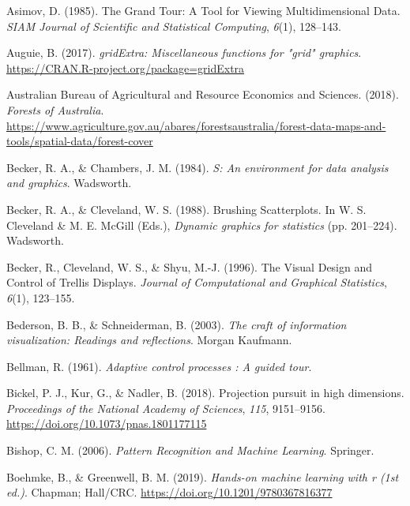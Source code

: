 \documentclass[
  letterpaper,
]{krantz}
\newlength{\cslhangindent}
\newlength{\cslentryspacingunit} %
\newenvironment{CSLReferences}[2] %
 {%
  \setlength{\parindent}{0pt}
  \ifodd #1
  \let\oldpar\par
  \def\par{\hangindent=\cslhangindent\oldpar}
  \fi
  \setlength{\parskip}{#2\cslentryspacingunit}
 }%
 {}
\begin{document}
\begin{CSLReferences}{1}{0}
\leavevmode{}%
Asimov, D. (1985). {T}he {G}rand {T}our: {A} {T}ool for {V}iewing
{M}ultidimensional {D}ata. \emph{SIAM Journal of Scientific and
Statistical Computing}, \emph{6}(1), 128--143.

\leavevmode{}%
Auguie, B. (2017). \emph{gridExtra: Miscellaneous functions for "grid"
graphics}. \url{https://CRAN.R-project.org/package=gridExtra}

\leavevmode{}%
Australian Bureau of Agricultural and Resource Economics and Sciences.
(2018). \emph{{Forests of Australia}}.
\url{https://www.agriculture.gov.au/abares/forestsaustralia/forest-data-maps-and-tools/spatial-data/forest-cover}

\leavevmode{}%
Becker, R. A., \& Chambers, J. M. (1984). \emph{{S}: An environment for
data analysis and graphics}. Wadsworth.

\leavevmode{}%
Becker, R. A., \& Cleveland, W. S. (1988). {B}rushing {S}catterplots. In
W. S. Cleveland \& M. E. McGill (Eds.), \emph{Dynamic graphics for
statistics} (pp. 201--224). Wadsworth.

\leavevmode{}%
Becker, R., Cleveland, W. S., \& Shyu, M.-J. (1996). {T}he {V}isual
{D}esign and {C}ontrol of {T}rellis {D}isplays. \emph{Journal of
Computational and Graphical Statistics}, \emph{6}(1), 123--155.

\leavevmode{}%
Bederson, B. B., \& Schneiderman, B. (2003). \emph{The craft of
information visualization: Readings and reflections}. Morgan Kaufmann.

\leavevmode{}%
Bellman, R. (1961). \emph{Adaptive control processes : A guided tour}.

\leavevmode{}%
Bickel, P. J., Kur, G., \& Nadler, B. (2018). Projection pursuit in high
dimensions. \emph{Proceedings of the National Academy of Sciences},
\emph{115}, 9151--9156. \url{https://doi.org/10.1073/pnas.1801177115}

\leavevmode{}%
Bishop, C. M. (2006). \emph{Pattern {R}ecognition and {M}achine
{L}earning}. Springer.

\leavevmode{}%
Boehmke, B., \& Greenwell, B. M. (2019). \emph{Hands-on machine learning
with r (1st ed.)}. Chapman; Hall/CRC.
\url{https://doi.org/10.1201/9780367816377}


\end{CSLReferences}
\end{document}
